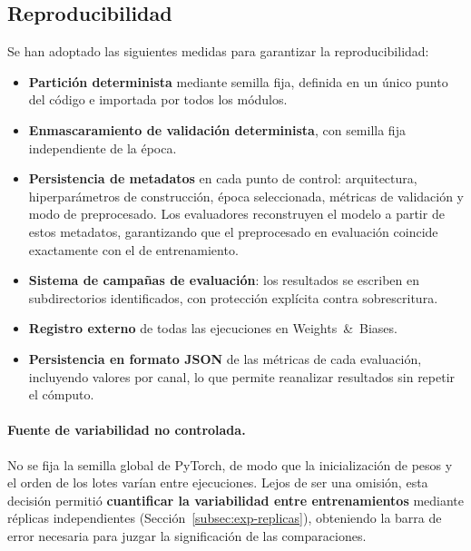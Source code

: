 \subsection{Reproducibilidad}
\label{subsec:reproducibilidad}

Se han adoptado las siguientes medidas para garantizar la reproducibilidad:

\begin{itemize}
    \item \textbf{Partición determinista} mediante semilla fija, definida en un único punto del
    código e importada por todos los módulos.
    \item \textbf{Enmascaramiento de validación determinista}, con semilla fija independiente de la
    época.
    \item \textbf{Persistencia de metadatos} en cada punto de control: arquitectura, hiperparámetros
    de construcción, época seleccionada, métricas de validación y modo de preprocesado. Los
    evaluadores reconstruyen el modelo a partir de estos metadatos, garantizando que el preprocesado
    en evaluación coincide exactamente con el de entrenamiento.
    \item \textbf{Sistema de campañas de evaluación}: los resultados se escriben en subdirectorios
    identificados, con protección explícita contra sobrescritura.
    \item \textbf{Registro externo} de todas las ejecuciones en Weights~\&~Biases.
    \item \textbf{Persistencia en formato JSON} de las métricas de cada evaluación, incluyendo
    valores por canal, lo que permite reanalizar resultados sin repetir el cómputo.
\end{itemize}

\paragraph{Fuente de variabilidad no controlada.} No se fija la semilla global de PyTorch, de modo
que la inicialización de pesos y el orden de los lotes varían entre ejecuciones. Lejos de ser una
omisión, esta decisión permitió \textbf{cuantificar la variabilidad entre entrenamientos} mediante
réplicas independientes (Sección~\ref{subsec:exp-replicas}), obteniendo la barra de error necesaria
para juzgar la significación de las comparaciones.

